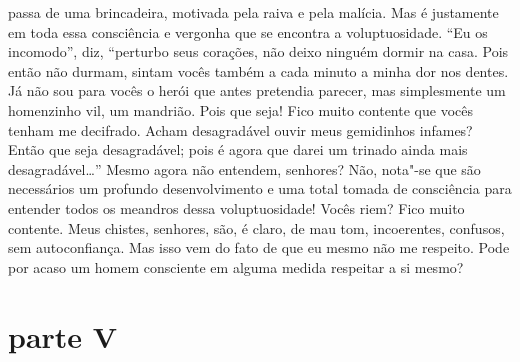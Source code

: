 passa de uma brincadeira, motivada pela raiva e pela malícia. Mas é
justamente em toda essa consciência e vergonha que se encontra a
voluptuosidade. ``Eu os incomodo'', diz, ``perturbo seus corações, não
deixo ninguém dormir na casa. Pois então não durmam, sintam vocês
também a cada minuto a minha dor nos dentes. Já não sou para vocês o
herói que antes pretendia parecer, mas simplesmente um homenzinho vil,
um mandrião. Pois que seja! Fico muito contente que vocês tenham me
decifrado. Acham desagradável ouvir meus gemidinhos infames? Então que
seja desagradável; pois é agora que darei um trinado ainda mais
desagradável\ldots{}'' Mesmo agora não entendem, senhores? Não, nota"-se que
são necessários um profundo desenvolvimento e uma total tomada de
consciência para entender todos os meandros dessa voluptuosidade! Vocês
riem? Fico muito contente. Meus chistes, senhores, são, é claro, de mau
tom, incoerentes, confusos, sem autoconfiança. Mas isso vem do fato de
que eu mesmo não me respeito. Pode por acaso um homem consciente em
alguma medida respeitar a si mesmo?


\section{parte V}

